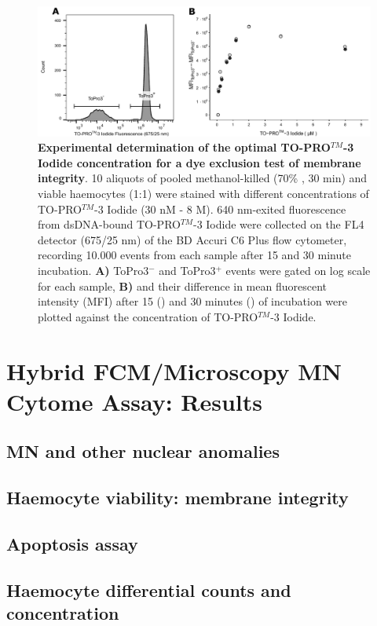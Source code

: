 \begin{figure}[h]
    \centering
    \includegraphics[width=1.0\textwidth]{figures/Method development/ToPro3 stainopt figure mean.pdf}
    \caption{\textbf{Experimental determination of the optimal TO-PRO$^{TM}$-3 Iodide concentration for a dye exclusion test of membrane integrity}. 10 aliquots of pooled methanol-killed (70\% , 30 min) and viable haemocytes (1:1) were stained with different concentrations of TO-PRO$^{TM}$-3 Iodide (30 nM - 8 \micro M). 640 nm-exited fluorescence from dsDNA-bound TO-PRO$^{TM}$-3 Iodide were collected on the FL4 detector (675/25 nm) of the BD Accuri C6 Plus flow cytometer, recording 10.000 events from each sample after 15 and 30 minute incubation. \textbf{A)} ToPro3$^{-}$ and ToPro3$^{+}$ events were gated on log scale for each sample, \textbf{B)} and their difference in mean fluorescent intensity (MFI) after 15 (\protect\lysegraacircle) and 30 minutes (\protect\darkgraycircle) of incubation were plotted against the concentration of TO-PRO$^{TM}$-3 Iodide.}
    \label{fig:ToPro3_stain_opt}
\end{figure}
































\newpage
\section{Hybrid FCM/Microscopy MN Cytome Assay: Results}
\subsection{MN and other nuclear anomalies}
\subsection{Haemocyte viability: membrane integrity}
\subsection{Apoptosis assay}
\subsection{Haemocyte differential counts and concentration}

